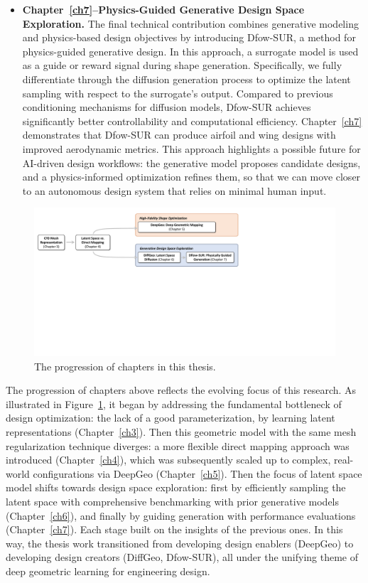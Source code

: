 \begin{itemize}
    \item \textbf{Chapter~\ref{ch7}--Physics-Guided Generative Design Space Exploration.} The final technical contribution combines generative modeling and physics-based design objectives by introducing Dfow-SUR, a method for physics-guided generative design. In this approach, a surrogate model is used as a guide or reward signal during shape generation. Specifically, we fully differentiate through the diffusion generation process to optimize the latent sampling with respect to the surrogate’s output. Compared to previous conditioning mechanisms for diffusion models, Dfow-SUR achieves significantly better controllability and computational efficiency. Chapter~\ref{ch7} demonstrates that Dfow-SUR can produce airfoil and wing designs with improved aerodynamic metrics. This approach highlights a possible future for AI-driven design workflows: the generative model proposes candidate designs, and a physics-informed optimization refines them, so that we can move closer to an autonomous design system that relies on minimal human input.
\end{itemize}

\begin{figure}
    \centering
    \includegraphics[width=0.98\linewidth]{chapter1/fig/evolution.pdf}
    \caption{The progression of chapters in this thesis.}
    \label{ch1:fig:evolution}
\end{figure}

The progression of chapters above reflects the evolving focus of this research. As illustrated in Figure~\ref{ch1:fig:evolution}, it began by addressing the fundamental bottleneck of design optimization: the lack of a good parameterization, by learning latent representations (Chapter~\ref{ch3}). Then this geometric model with the same mesh regularization technique diverges: a more flexible direct mapping approach was introduced (Chapter~\ref{ch4}), which was subsequently scaled up to complex, real-world configurations via DeepGeo (Chapter~\ref{ch5}). Then the focus of latent space model shifts towards design space exploration: first by efficiently sampling the latent space with comprehensive benchmarking with prior generative models (Chapter~\ref{ch6}), and finally by guiding generation with performance evaluations (Chapter~\ref{ch7}). Each stage built on the insights of the previous ones. In this way, the thesis work transitioned from developing design enablers (DeepGeo) to developing design creators (DiffGeo, Dfow-SUR), all under the unifying theme of deep geometric learning for engineering design. 

